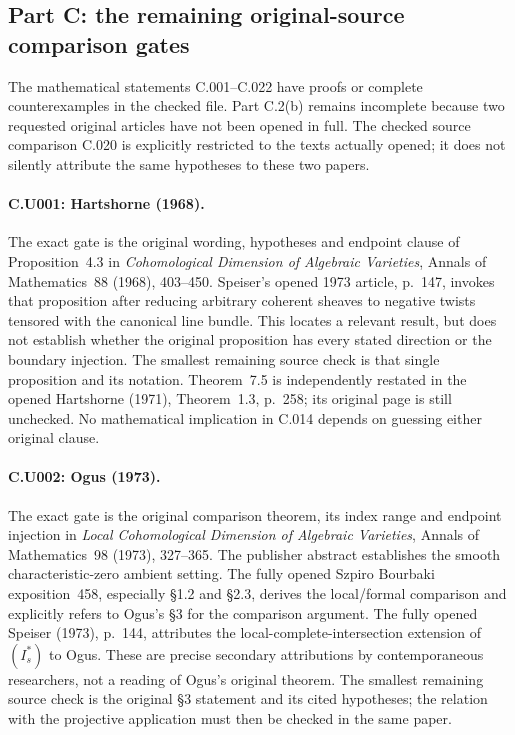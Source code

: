 \subsection{Part C: the remaining original-source comparison gates}
The mathematical statements C.001--C.022 have proofs or complete
counterexamples in the checked file. Part C.2(b) remains incomplete
because two requested original articles have not been opened in full.
The checked source comparison C.020 is explicitly restricted to the
texts actually opened; it does not silently attribute the same
hypotheses to these two papers.

\paragraph{C.U001: Hartshorne (1968).}
The exact gate is the original wording, hypotheses and endpoint
clause of Proposition~4.3 in \emph{Cohomological Dimension of
Algebraic Varieties}, Annals of Mathematics~88 (1968), 403--450.
Speiser's opened 1973 article, p.~147, invokes that proposition
after reducing arbitrary coherent sheaves to negative twists
tensored with the canonical line bundle. This locates a relevant
result, but does not establish whether the original proposition
has every stated direction or the boundary injection. The smallest
remaining source check is that single proposition and its notation.
Theorem~7.5 is independently restated in the opened Hartshorne
(1971), Theorem~1.3, p.~258; its original page is still unchecked.
No mathematical implication in C.014 depends on guessing either
original clause.

\paragraph{C.U002: Ogus (1973).}
The exact gate is the original comparison theorem, its index
range and endpoint injection in \emph{Local Cohomological
Dimension of Algebraic Varieties}, Annals of Mathematics~98
(1973), 327--365. The publisher abstract establishes the
smooth characteristic-zero ambient setting. The fully opened
Szpiro Bourbaki exposition~458, especially \S1.2 and \S2.3,
derives the local/formal comparison and explicitly refers to
Ogus's \S3 for the comparison argument. The fully opened
Speiser (1973), p.~144, attributes the local-complete-intersection
extension of $(I_s^*)$ to Ogus. These are precise secondary
attributions by contemporaneous researchers, not a reading of
Ogus's original theorem. The smallest remaining source check
is the original \S3 statement and its cited hypotheses; the
relation with the projective application must then be checked
in the same paper.

